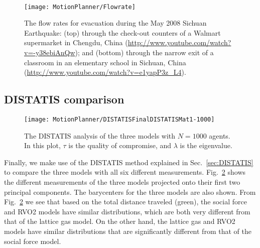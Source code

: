 \begin{figure*}[!tbp]
\centering
{}
\hspace{1cm}
\\
\caption[Visualization of flow rates]{Flow rates at the exit as functions of time for the (a) lattice gas, (b) social force, and (c) RVO2 models. For each model and $N$, the flow rate is averaged over 100 simulations.}
\label{fig:FlowRate}
\end{figure*}

\begin{figure}[!tbp]
\centering
\texttt{[image: MotionPlanner/Flowrate]}
\caption[Flow rates during Sichuan earthquake equation]{The flow rates for evacuation during the May 2008 Sichuan Earthquake: (top) through the check-out counters of a Walmart supermarket in Chengdu, China (\url{http://www.youtube.com/watch?v=-y38ebiAnQw}); and (bottom) through the narrow exit of a classroom in an elementary school in Sichuan, China (\url{http://www.youtube.com/watch?v=e1yapP3z_L4}).}
\centering
\label{fig:RealData}
\end{figure}


\subsection{DISTATIS comparison}

\begin{figure}[!tbp]
\centering
\texttt{[image: MotionPlanner/DISTATISFinalDISTATISMat1-1000]}
\caption[DISTATIS analysis of three models]{The DISTATIS analysis of the three models with $N = 1000$ agents. In this plot, $\tau$ is the quality of compromise, and $\lambda$ is the eigenvalue.}
\label{fig:DISTATIS1000}
\end{figure}

Finally, we make use of the DISTATIS method explained in Sec.~\ref{sec:DISTATIS} to compare the three models with all six different measurements. Fig.~\ref{fig:DISTATIS1000} shows the different measurements of the three models projected onto their first two principal components. The barycenters for the three models are also shown. From Fig.~\ref{fig:DISTATIS1000} we see that based on the total distance traveled (green), the social force and RVO2 models have similar distributions, which are both very different from that of the lattice gas model. On the other hand, the lattice gas and RVO2 models have similar distributions that are significantly different from that of the social force model.

